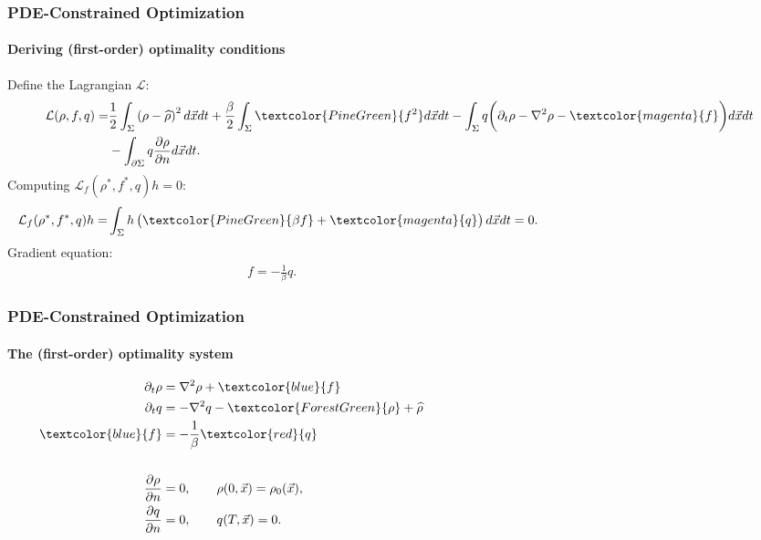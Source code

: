 \documentclass[aspectratio=169,xcolor=dvipsnames]{beamer}
\begin{document}
\begin{frame}
	\frametitle{PDE-Constrained Optimization}
	\framesubtitle{Deriving (first-order) optimality conditions}
	Define the Lagrangian $\mathcal{L}$:
	\begin{align*}
		\mathcal{L}(\rho, f,q)=& \frac{1}{2}\int_\Sigma \left(\rho- \widehat{\rho}\right)^2 d \vec x dt + \frac{\beta}{2} \int_\Sigma \textcolor{PineGreen}{f^2} d \vec x dt - \int_\Sigma q \bigg( \partial_t \rho - \nabla^2 \rho  - \textcolor{magenta}{f} \bigg) d\vec{x} dt \\
		&- \int_{\partial \Sigma} q \frac{\partial \rho}{\partial n}   d\vec{x} dt.
	\end{align*}
	Computing  $\mathcal{L}_f (\rho^*, f^*,q)h = 0$:
	\begin{align*}
		\mathcal{L}_f (\rho^*, f^*,q)h = & \int_\Sigma h \left(\textcolor{PineGreen}{\beta f} + \textcolor{magenta}{q} \right) d\vec{x} dt = 0.\qquad\qquad\qquad\qquad\qquad\qquad\qquad\qquad\qquad
	\end{align*}
	Gradient equation:
	\begin{align*}
		f = -\frac{1}{\beta}q. \qquad\qquad\qquad\qquad\qquad\qquad\qquad\qquad\qquad\qquad
	\end{align*}
\end{frame}
\begin{frame}
	\frametitle{PDE-Constrained Optimization}
	\framesubtitle{The (first-order) optimality system}
	
	\begin{align*}
		\partial_t \rho &= \nabla^2 \rho + \textcolor{blue}{f}  \\
		\partial_t q &=  -  \nabla^2 q - \textcolor{ForestGreen}{\rho} + \widehat \rho 
		\phantom{ngodshornvnien fjpisj wfseij gvjepi vwe  bfkdienwpiemf feq}\\
		\textcolor{blue}{f} &= - \frac{1}{\beta}\textcolor{red}{q}\\
		\\
		\frac{\partial \rho}{\partial n} &= 0, \qquad \rho(0,\vec{x})=\rho_0(\vec{x}),\\
		\frac{\partial q}{\partial n} &= 0, \qquad q(T,\vec{x})= 0.
	\end{align*}
\end{frame}
\end{document}
